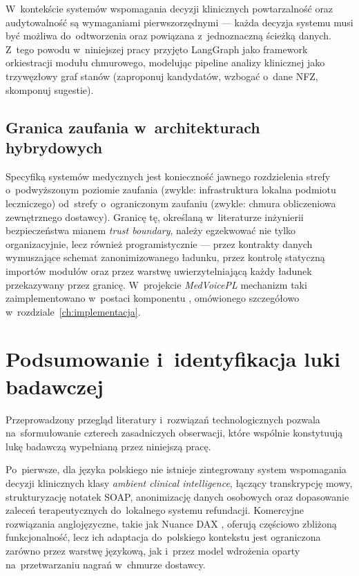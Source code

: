 W~kontekście systemów wspomagania decyzji klinicznych powtarzalność
oraz audytowalność są wymaganiami pierwszorzędnymi --- każda decyzja
systemu musi być możliwa do~odtworzenia oraz powiązana z~jednoznaczną
ścieżką danych. Z~tego powodu w~niniejszej pracy przyjęto LangGraph
jako framework orkiestracji modułu chmurowego, modelując pipeline
analizy klinicznej jako trzywęzłowy graf stanów (zaproponuj kandydatów,
wzbogać o~dane NFZ, skomponuj sugestie).

\subsection{Granica zaufania w~architekturach hybrydowych}

Specyfiką systemów medycznych jest konieczność jawnego rozdzielenia
strefy o~podwyższonym poziomie zaufania (zwykle: infrastruktura
lokalna podmiotu leczniczego) od~strefy o~ograniczonym zaufaniu
(zwykle: chmura obliczeniowa zewnętrznego dostawcy). Granicę tę,
określaną w~literaturze inżynierii bezpieczeństwa mianem \emph{trust
boundary}, należy egzekwować nie tylko organizacyjnie, lecz również
programistycznie --- przez kontrakty danych wymuszające schemat
zanonimizowanego ładunku, przez kontrolę statyczną importów modułów
oraz przez warstwę uwierzytelniającą każdy ładunek przekazywany
przez granicę. W~projekcie \emph{MedVoicePL} mechanizm taki
zaimplementowano w~postaci komponentu ,
omówionego szczegółowo w~rozdziale~\ref{ch:implementacja}.

\section{Podsumowanie i~identyfikacja luki badawczej}%
\label{sec:stan-wiedzy-podsumowanie}

Przeprowadzony przegląd literatury i~rozwiązań technologicznych
pozwala na~sformułowanie czterech zasadniczych obserwacji, które
wspólnie konstytuują lukę badawczą wypełnianą przez niniejszą pracę.

Po~pierwsze, dla języka polskiego nie istnieje zintegrowany system
wspomagania decyzji klinicznych klasy \emph{ambient clinical
intelligence}, łączący transkrypcję mowy, strukturyzację notatek
SOAP, anonimizację danych osobowych oraz dopasowanie zaleceń
terapeutycznych do~lokalnego systemu refundacji.
Komercyjne rozwiązania anglojęzyczne, takie jak Nuance DAX
\parencite{nuancedax2024}, oferują częściowo zbliżoną funkcjonalność,
lecz ich adaptacja do~polskiego kontekstu jest ograniczona zarówno
przez warstwę językową, jak i~przez model wdrożenia oparty
na~przetwarzaniu nagrań w~chmurze dostawcy.

